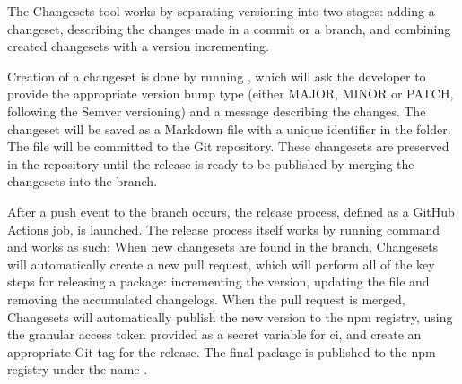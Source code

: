 The Changesets tool works by separating versioning into two stages: adding a changeset, describing the changes made in a commit or a branch, and combining created changesets with a version incrementing.

Creation of a changeset is done by running , which will ask the developer to provide the appropriate version bump type (either MAJOR, MINOR or PATCH, following the Semver versioning) and a message describing the changes. The changeset will be saved as a Markdown file with a unique identifier in the  folder. The file will be committed to the Git repository. These changesets are preserved in the repository until the release is ready to be published by merging the changesets into the  branch.

After a push event to the  branch occurs, the release process, defined as a GitHub Actions job, is launched. The release process itself works by running  command and works as such; When new changesets are found in the  branch, Changesets will automatically create a new pull request, which will perform all of the key steps for releasing a package: incrementing the version, updating the  file and removing the accumulated changelogs. When the pull request is merged, Changesets will automatically publish the new version to the \acrshort{npm} registry, using the granular access token provided as a secret variable for \acrshort{ci}, and create an appropriate Git tag for the release. The final package is published to the \acrshort{npm} registry under the name  \cite{Tsmathevaluate2023}. 
